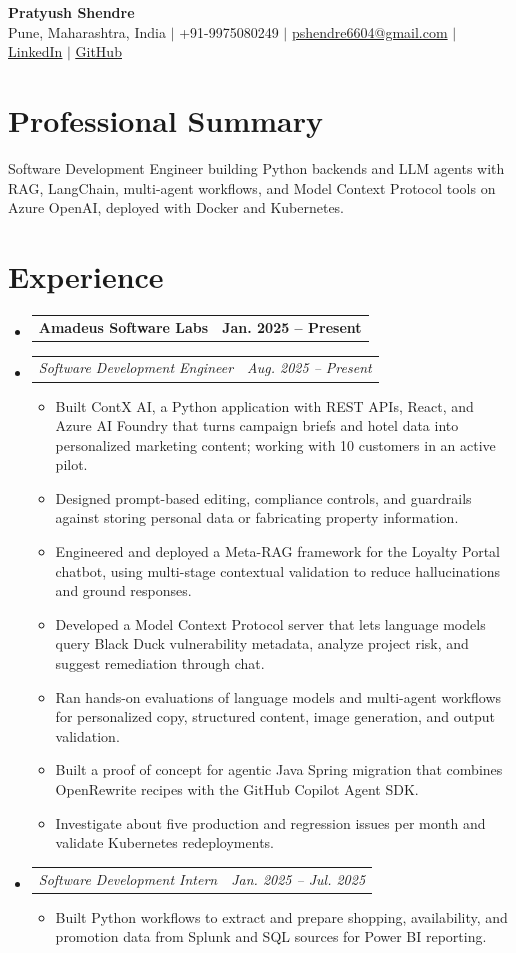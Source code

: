 \documentclass[a4paper,11pt]{article}
\makeatletter
\newcommand{\bulletpoint}[1]{\item\small{#1}}
\newcommand{\company}[2]{\item\begin{tabularx}{\textwidth}{@{}Xr@{}}\textbf{#1}& \textbf{#2}\end{tabularx}\vspace{-4pt}}
\newcommand{\role}[2]{\item\begin{tabularx}{\textwidth}{@{}Xr@{}}\textit{\small #1}&\textit{\small #2}\end{tabularx}\vspace{-5pt}}
\makeatother
\begin{document}
\begin{center}
  {\Large\bfseries Pratyush Shendre}\\[2pt]
  \small Pune, Maharashtra, India $|$ +91-9975080249 $|$
  \href{mailto:pshendre6604@gmail.com}{pshendre6604@gmail.com} $|$
  \href{https://www.linkedin.com/in/pratyush-shendre-2256a7223/}{\underline{LinkedIn}} $|$
  \href{https://github.com/PratyushS04}{\underline{GitHub}}
\end{center}

\section{Professional Summary}
\small Software Development Engineer building Python backends and LLM agents with RAG, LangChain, multi-agent \mbox{workf{}lows}, and Model Context Protocol tools on Azure OpenAI, deployed with Docker and Kubernetes.

\section{Experience}
\begin{itemize}[leftmargin=0in,label={}]
  \company{Amadeus Software Labs}{Jan. 2025 -- Present}
  \role{Software Development Engineer}{Aug. 2025 -- Present}
  \begin{itemize}
    \bulletpoint{Built ContX AI, a Python application with REST APIs, React, and Azure AI Foundry that turns campaign briefs and hotel data into personalized marketing content; working with 10 customers in an active pilot.}
    \bulletpoint{Designed prompt-based editing, compliance controls, and guardrails against storing personal data or fabricating property information.}
    \bulletpoint{Engineered and deployed a Meta-RAG framework for the Loyalty Portal chatbot, using multi-stage contextual validation to reduce hallucinations and ground responses.}
    \bulletpoint{Developed a Model Context Protocol server that lets language models query Black Duck vulnerability metadata, analyze project risk, and suggest remediation through chat.}
    \bulletpoint{Ran hands-on evaluations of language models and multi-agent workf{}lows for personalized copy, structured content, image generation, and output validation.}
    \bulletpoint{Built a proof of concept for agentic Java Spring migration that combines OpenRewrite recipes with the GitHub Copilot Agent SDK.}
    \bulletpoint{Investigate about f{}ive production and regression issues per month and validate Kubernetes redeployments.}
  \end{itemize}
  \role{Software Development Intern}{Jan. 2025 -- Jul. 2025}
  \begin{itemize}
    \bulletpoint{Built Python workf{}lows to extract and prepare shopping, availability, and promotion data from Splunk and SQL sources for Power BI reporting.}
  \end{itemize}
\end{itemize}
\end{document}
